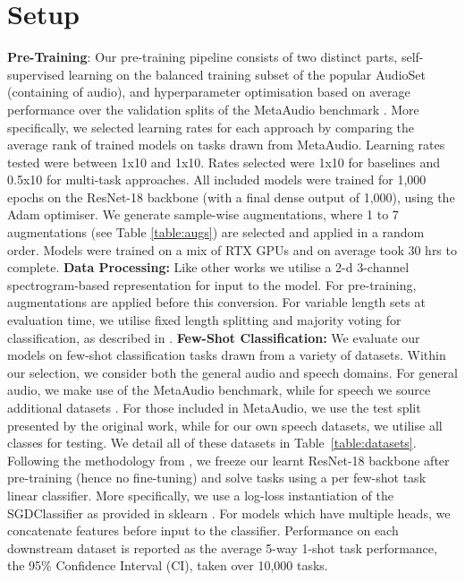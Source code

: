 \documentclass{INTERSPEECH2023}
\begin{document}
\section{Setup}
\label{section:setup}
\noindent\textbf{Pre-Training}: Our pre-training pipeline consists of two distinct parts, self-supervised learning on the balanced training subset of the popular AudioSet \cite{audioset} (containing  of audio), and hyperparameter optimisation based on average performance over the validation splits of the MetaAudio benchmark \cite{metaaudio}. More specifically, we selected learning rates for each approach by comparing the average rank of trained models on tasks drawn from MetaAudio. Learning rates tested were between 1x10 and 1x10. Rates selected were 1x10 for baselines and 0.5x10 for multi-task approaches.  All included models were trained for 1,000 epochs on the ResNet-18 backbone (with a final dense output of 1,000), using the Adam \cite{adam_opt} optimiser. We generate sample-wise augmentations, where 1 to 7 augmentations (see Table \ref{table:augs}) are selected and applied in a random order. Models were trained on a mix of RTX GPUs and on average took 30 hrs to complete. 
\newline\noindent\textbf{Data Processing:} Like other works \cite{clar,cola} we utilise a 2-d 3-channel spectrogram-based representation for input to the model. For pre-training, augmentations are applied before this conversion. For variable length sets at evaluation time, we utilise fixed length splitting and majority voting for classification, as described in \cite{metaaudio}. 
\newline\noindent\textbf{Few-Shot Classification:} We evaluate our models on few-shot classification tasks drawn from a variety of datasets. Within our selection, we consider both the general audio and speech domains. For general audio, we make use of the MetaAudio \cite{metaaudio} benchmark, while for speech we source additional datasets \cite{cremad, saa, common_voice}. For those included in MetaAudio, we use the test split presented by the original work, while for our own speech datasets, we utilise all classes for testing. We detail all of these datasets in Table~\ref{table:datasets}. Following the methodology from \cite{linear_eval}, we freeze our learnt ResNet-18 backbone after pre-training (hence no fine-tuning) and solve tasks using a per few-shot task linear classifier. More specifically, we use a log-loss instantiation of the SGDClassifier as provided in sklearn \cite{sklearn}. For models which have multiple heads, we concatenate features before input to the classifier. Performance on each downstream dataset is reported as the average 5-way 1-shot task performance,  the 95\% Confidence Interval (CI), taken over 10,000 tasks. 
\end{document}
